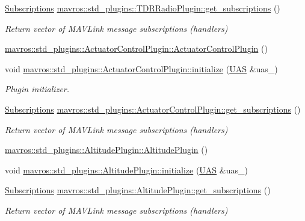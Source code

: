 \begin{DoxyCompactItemize}
\mbox{\hyperlink{group__plugin_ga8967d61fc77040e0c3ea5a4585d62a09}{Subscriptions}} \mbox{\hyperlink{group__plugin_ga2cc39d74800d519194a4f65eea343f16}{mavros\+::std\+\_\+plugins\+::\+T\+D\+R\+Radio\+Plugin\+::get\+\_\+subscriptions}} ()
\begin{DoxyCompactList}\small\item\em Return vector of M\+A\+V\+Link message subscriptions (handlers) \end{DoxyCompactList}\item 
\mbox{\hyperlink{group__plugin_gab65fc2cc66cc9797ed137a145fa98cb5}{mavros\+::std\+\_\+plugins\+::\+Actuator\+Control\+Plugin\+::\+Actuator\+Control\+Plugin}} ()
\item 
void \mbox{\hyperlink{group__plugin_ga5da058a4de90d9d0a05ff7b66f6d108b}{mavros\+::std\+\_\+plugins\+::\+Actuator\+Control\+Plugin\+::initialize}} (\mbox{\hyperlink{classmavros_1_1UAS}{U\+AS}} \&uas\+\_\+)
\begin{DoxyCompactList}\small\item\em Plugin initializer. \end{DoxyCompactList}\item 
\mbox{\hyperlink{group__plugin_ga8967d61fc77040e0c3ea5a4585d62a09}{Subscriptions}} \mbox{\hyperlink{group__plugin_ga9f95e6748d25efba2ab30f5d701cf17c}{mavros\+::std\+\_\+plugins\+::\+Actuator\+Control\+Plugin\+::get\+\_\+subscriptions}} ()
\begin{DoxyCompactList}\small\item\em Return vector of M\+A\+V\+Link message subscriptions (handlers) \end{DoxyCompactList}\item 
\mbox{\hyperlink{group__plugin_gadbc07fbf84dc0c7445f72271e672e0c6}{mavros\+::std\+\_\+plugins\+::\+Altitude\+Plugin\+::\+Altitude\+Plugin}} ()
\item 
void \mbox{\hyperlink{group__plugin_ga5aeb9ab8ababf66ba15c0bf2705c6162}{mavros\+::std\+\_\+plugins\+::\+Altitude\+Plugin\+::initialize}} (\mbox{\hyperlink{classmavros_1_1UAS}{U\+AS}} \&uas\+\_\+)
\item 
\mbox{\hyperlink{group__plugin_ga8967d61fc77040e0c3ea5a4585d62a09}{Subscriptions}} \mbox{\hyperlink{group__plugin_gafd32c19f38dc1c1c634d9090b3319af6}{mavros\+::std\+\_\+plugins\+::\+Altitude\+Plugin\+::get\+\_\+subscriptions}} ()
\begin{DoxyCompactList}\small\item\em Return vector of M\+A\+V\+Link message subscriptions (handlers) \end{DoxyCompactList}\item 

\end{DoxyCompactItemize}
